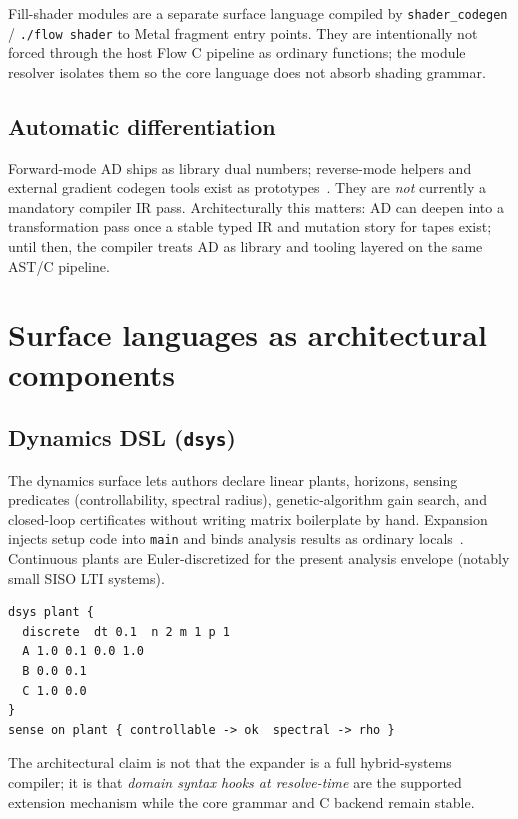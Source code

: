\documentclass[11pt,a4paper]{article}
\theoremstyle{remark}
\begin{document}
Fill-shader modules are a separate surface language compiled by
\texttt{shader\_codegen} / \texttt{./flow shader} to Metal fragment entry
points. They are intentionally not forced through the host Flow C pipeline as
ordinary functions; the module resolver isolates them so the core language does
not absorb shading grammar.

\subsection{Automatic differentiation}
\label{sec:ad}

Forward-mode AD ships as library dual numbers; reverse-mode helpers and
external gradient codegen tools exist as prototypes~\cite{flow-ad}. They are
\emph{not} currently a mandatory compiler IR pass. Architecturally this matters:
AD can deepen into a transformation pass once a stable typed IR and mutation
story for tapes exist; until then, the compiler treats AD as library and
tooling layered on the same AST/C pipeline.

\section{Surface languages as architectural components}
\label{sec:surfaces}

\subsection{Dynamics DSL (\texttt{dsys})}

The dynamics surface lets authors declare linear plants, horizons, sensing
predicates (controllability, spectral radius), genetic-algorithm gain search,
and closed-loop certificates without writing matrix boilerplate by hand.
Expansion injects setup code into \texttt{main} and binds analysis results as
ordinary locals~\cite{flow-dsys}. Continuous plants are Euler-discretized for
the present analysis envelope (notably small SISO LTI systems).

\begin{lstlisting}
dsys plant {
  discrete  dt 0.1  n 2 m 1 p 1
  A 1.0 0.1 0.0 1.0
  B 0.0 0.1
  C 1.0 0.0
}
sense on plant { controllable -> ok  spectral -> rho }
\end{lstlisting}

The architectural claim is not that the expander is a full hybrid-systems
compiler; it is that \emph{domain syntax hooks at resolve-time} are the
supported extension mechanism while the core grammar and C backend remain
stable.
\end{document}
